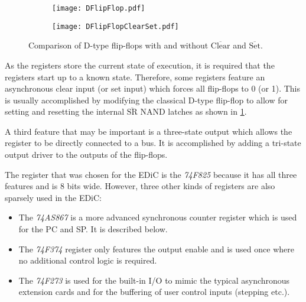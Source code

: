 \begin{figure}[t]
  \centering
  \begin{subfigure}[b]{.45\textwidth}
    \texttt{[image: DFlipFlop.pdf]}
  \end{subfigure}%
  \hspace{.05\textwidth}
  \begin{subfigure}[b]{.45\textwidth}
    \texttt{[image: DFlipFlopClearSet.pdf]}
  \end{subfigure}
  \caption{Comparison of D-type flip-flops with and without $\overline{\text{Clear}}$ and $\overline{\text{Set}}$.}
  \label{fig:clearSet}
\end{figure}

As the registers store the current state of execution, it is required that the registers start up to a known state.
Therefore, some registers feature an asynchronous clear input (or set input) which forces all flip-flops to 0 (or 1).
This is usually accomplished by modifying the classical D-type flip-flop to allow for setting and resetting the internal $\overline{\text{SR}}$ NAND latches as shown in \cref{fig:clearSet}.

A third feature that may be important is a three-state output which allows the register to be directly connected to a bus.
It is accomplished by adding a tri-state output driver to the outputs of the flip-flops.

The register that was chosen for the \gls{EDiC} is the \emph{74F825} because it has all three features and is 8 bits wide.
However, three other kinds of registers are also sparsely used in the \gls{EDiC}:
\begin{itemize}
  \item The \emph{74AS867} is a more advanced synchronous counter register which is used for the \gls{PC} and \gls{SP}. It is described below.
  \item The \emph{74F374} register only features the output enable and is used once where no additional control logic is required.
  \item The \emph{74F273} is used for the built-in I/O to mimic the typical asynchronous extension cards and for the buffering of user control inputs (stepping etc.).
\end{itemize}


